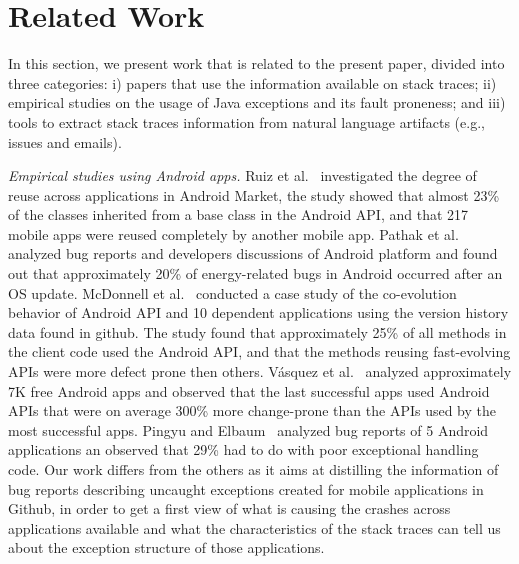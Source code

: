 \documentclass[conference]{IEEEtran}
\begin{document}
\section{Related Work}
\label{sec:rele}

In this section, we present work that is related to the present paper, divided into
three categories: i) papers that use the information available on stack traces;
ii) empirical studies on the usage of Java exceptions and its fault proneness;
and iii) tools to extract stack traces information from natural language artifacts
(e.g., issues and emails).


\textit{Empirical studies using Android apps.} Ruiz et al.~\cite{Ruiz12}
investigated the degree of reuse across applications in Android Market, the
study showed that almost 23\% of the classes inherited from a base class in the
Android API, and that 217 mobile apps were reused completely by another mobile
app. Pathak et al.~\cite{Patha11} analyzed bug reports and developers
discussions of Android platform and found out that approximately 20\% of
energy-related bugs in Android occurred after an OS update. McDonnell et
al.~\cite{McDon13} conducted a case study of the co-evolution behavior of
Android API and 10 dependent applications using the version history data found
in github. The study found that approximately 25\% of all methods in the client
code used the Android API, and that the methods reusing fast-evolving APIs were
more defect prone then others. Vásquez et al.~\cite{Linar13} analyzed
approximately 7K free Android apps and observed that the last successful apps
used Android APIs that were on average 300\% more change-prone than the APIs
used by the most successful apps. Pingyu and Elbaum~\cite{Zhang12} analyzed bug
reports of 5 Android applications an observed that 29\% had to do with poor
exceptional handling code. Our work differs from the others as it aims at
distilling the information of bug reports describing uncaught exceptions created
for mobile applications in Github, in order to get a first view
of what is causing the crashes across applications available and what the
characteristics of the stack traces can tell us about the exception structure of
those applications.
\end{document}
